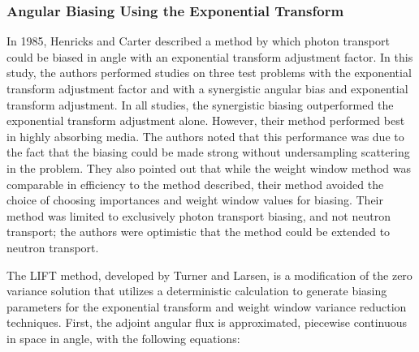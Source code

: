 %
%

\subsubsection{Angular Biasing Using the Exponential Transform}

In 1985, Henricks and Carter \cite{hendricks_anisotropic_1985} described a
method by which
photon transport could be biased in angle with an exponential transform
adjustment factor.
In this study, the authors performed studies on three test problems with the
exponential
transform adjustment factor and with a synergistic angular bias and exponential
transform
adjustment.
In all studies, the synergistic biasing outperformed the exponential transform
adjustment
alone.
However, their method performed best in highly absorbing media.
The authors noted that this performance was due to the fact that the biasing
could be made
strong without undersampling scattering in the problem.
They also pointed out that while the weight window method was comparable in
efficiency to the
method described, their method avoided the choice of choosing importances and
weight window
values for biasing. Their method was limited to exclusively photon transport
biasing, and not
neutron transport; the authors were optimistic that the method could be extended
to neutron
transport.

The LIFT \cite{turner_automatic_1997} method, developed by Turner and Larsen, is
a modification
of the zero variance solution that utilizes a deterministic calculation to
generate biasing
parameters for the exponential transform and weight window variance reduction
techniques.
First, the adjoint angular flux is approximated, piecewise continuous in space
in angle,
with the following equations:

